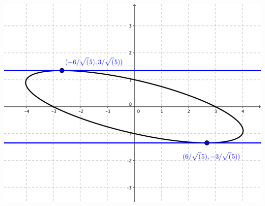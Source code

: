 \documentclass[nooutcomes]{ximera}
\begin{document}
\begin{problem}
\begin{enumerate}
\begin{freeResponse}
		\begin{image}
\includegraphics[scale=.6]{figure3.png}
\end{image}		
		
		\end{freeResponse}
		
		
		
	\end{enumerate}
			
			
	
\end{problem}
\end{document}
